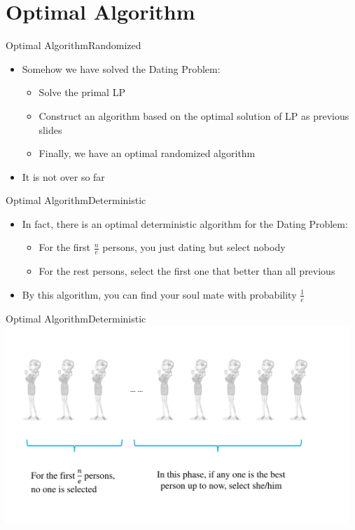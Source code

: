 \documentclass{beamer}
\begin{document}
\section{Optimal Algorithm}
\begin{frame}{Optimal Algorithm}{Randomized}
	\begin{itemize}
		\item Somehow we have solved the Dating Problem:
			\begin{itemize}
				\item Solve the primal LP
				\item Construct an algorithm based on the optimal solution of LP as previous slides
				\item Finally, we have an optimal randomized algorithm
			\end{itemize}
	    \item It is not over so far
	\end{itemize}
\end{frame}

\begin{frame}{Optimal Algorithm}{Deterministic}
	\begin{itemize}
		\item In fact, there is an optimal deterministic algorithm for the Dating Problem:
			\begin{itemize}
					\item For the first $\frac{n}{e}$ persons, you just dating but select nobody
				\item For the rest persons, select the first one that better than all previous
			\end{itemize}
	\item By this algorithm, you can find your soul mate with probability $\frac{1}{e}$
	\end{itemize}
\end{frame}

\begin{frame}{Optimal Algorithm}{Deterministic}
	\centering\includegraphics[width=13cm]{Problems/present-1}
\end{frame}
\end{document}
